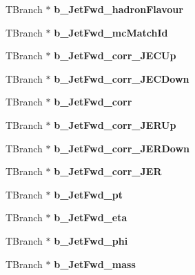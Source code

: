 \begin{DoxyCompactItemize}
T\+Branch $\ast$ {\bfseries b\+\_\+\+Jet\+Fwd\+\_\+hadron\+Flavour}
\item 
\hypertarget{classMiniTree_ab445556492045a62b6c9382a6efa3b3f}{}\label{classMiniTree_ab445556492045a62b6c9382a6efa3b3f} 
T\+Branch $\ast$ {\bfseries b\+\_\+\+Jet\+Fwd\+\_\+mc\+Match\+Id}
\item 
\hypertarget{classMiniTree_a49d1fd51bb9ec86f64d337d5a28364a9}{}\label{classMiniTree_a49d1fd51bb9ec86f64d337d5a28364a9} 
T\+Branch $\ast$ {\bfseries b\+\_\+\+Jet\+Fwd\+\_\+corr\+\_\+\+J\+E\+C\+Up}
\item 
\hypertarget{classMiniTree_a08c5a7d7f96cab44fd5a784c61a9df78}{}\label{classMiniTree_a08c5a7d7f96cab44fd5a784c61a9df78} 
T\+Branch $\ast$ {\bfseries b\+\_\+\+Jet\+Fwd\+\_\+corr\+\_\+\+J\+E\+C\+Down}
\item 
\hypertarget{classMiniTree_a551846afd067053048f14ae372692c9e}{}\label{classMiniTree_a551846afd067053048f14ae372692c9e} 
T\+Branch $\ast$ {\bfseries b\+\_\+\+Jet\+Fwd\+\_\+corr}
\item 
\hypertarget{classMiniTree_a8e677671679191d98a55626a04d1e00e}{}\label{classMiniTree_a8e677671679191d98a55626a04d1e00e} 
T\+Branch $\ast$ {\bfseries b\+\_\+\+Jet\+Fwd\+\_\+corr\+\_\+\+J\+E\+R\+Up}
\item 
\hypertarget{classMiniTree_a240d784e737fc37a292f79c3a4d187e5}{}\label{classMiniTree_a240d784e737fc37a292f79c3a4d187e5} 
T\+Branch $\ast$ {\bfseries b\+\_\+\+Jet\+Fwd\+\_\+corr\+\_\+\+J\+E\+R\+Down}
\item 
\hypertarget{classMiniTree_acb662d010cc210024190aedf8c6ffdef}{}\label{classMiniTree_acb662d010cc210024190aedf8c6ffdef} 
T\+Branch $\ast$ {\bfseries b\+\_\+\+Jet\+Fwd\+\_\+corr\+\_\+\+J\+ER}
\item 
\hypertarget{classMiniTree_a1ff3a4bf4bd8991d3c2a8c994ebad9ae}{}\label{classMiniTree_a1ff3a4bf4bd8991d3c2a8c994ebad9ae} 
T\+Branch $\ast$ {\bfseries b\+\_\+\+Jet\+Fwd\+\_\+pt}
\item 
\hypertarget{classMiniTree_ae3fadbc5a5276ef05259f1635c5d358e}{}\label{classMiniTree_ae3fadbc5a5276ef05259f1635c5d358e} 
T\+Branch $\ast$ {\bfseries b\+\_\+\+Jet\+Fwd\+\_\+eta}
\item 
\hypertarget{classMiniTree_ac5c8cad79ac131636aa50e16dccdac41}{}\label{classMiniTree_ac5c8cad79ac131636aa50e16dccdac41} 
T\+Branch $\ast$ {\bfseries b\+\_\+\+Jet\+Fwd\+\_\+phi}
\item 
\hypertarget{classMiniTree_a0a2988cab51b0bbc29ed87e2a0e37a41}{}\label{classMiniTree_a0a2988cab51b0bbc29ed87e2a0e37a41} 
T\+Branch $\ast$ {\bfseries b\+\_\+\+Jet\+Fwd\+\_\+mass}

\end{DoxyCompactItemize}
